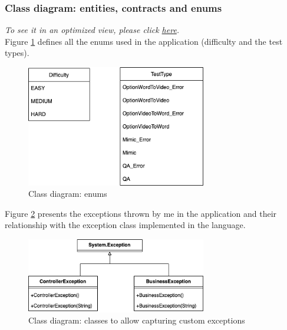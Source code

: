         \subsubsection{Class diagram: entities, contracts and enums}
            \textit{To see it in an optimized view, please click \href{https://github.com/JesusGonzalezA/LearnASLDoc/blob/master/doc/assets/diagrams/interfaces.png}{here}.} \\
            Figure \ref{fig:implementation_enums} defines all the enums used in the application (difficulty and the test types).
            \begin{figure}[H]
                \centering
                    \includegraphics[width=0.7\textwidth]{assets/diagrams/enums.png}
                \caption{Class diagram: enums}
                \label{fig:implementation_enums}
            \end{figure}

            Figure \ref{fig:implementation_exceptions_clasess} presents the exceptions thrown by me in the application and their relationship with 
            the exception class implemented in the language.
            \begin{figure}[H]
                \centering
                    \includegraphics[width=0.7\textwidth]{assets/diagrams/exceptions_classes.png}
                \caption{Class diagram: classes to allow capturing custom exceptions}
                \label{fig:implementation_exceptions_clasess}
            \end{figure}

